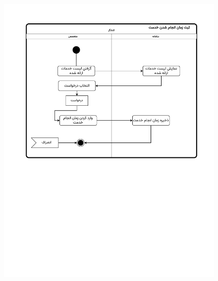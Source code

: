 \begin{figure}[ht!]
	\centering
	\includegraphics[scale=0.8, page=1]{figs/OOD-activity-reqtime.pdf}
\end{figure}
\FloatBarrier
\newpage


